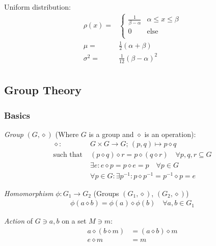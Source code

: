			\noindent
			Uniform distribution:
			\begin{equation}
				\begin{aligned}
					\rho(x) =& \left\{\begin{array}{ll}
					\frac{1}{\beta-\alpha} & \alpha\le x\le \beta \\
					0 & \text{else} \\
					\end{array}\right. \\
					\mu =& \frac{1}{2}(\alpha+\beta) \\
					\sigma^2 =& \frac{1}{12}(\beta-\alpha)^2 \\
				\end{aligned}
			\end{equation}

	\subsection{Group Theory}
		\subsubsection{Basics}
			\emph{Group} $(G, \diamond)$ (Where $G$ is a group and $\diamond$ is an operation):
			\begin{equation}
				\begin{aligned}
					\diamond: &G \times G \rightarrow G;\, (p,q) \mapsto p\diamond q \\
					\text{such that}\; &(p\diamond q)\diamond r = p\diamond (q\diamond r)\quad\forall{p,q,r}\subseteq G \\
					&\exists e: e\diamond p = p\diamond e = p\quad\forall p\in G\\
					&\forall p \in G: \exists p^{-1}: p\diamond p^{-1} = p^{-1}\diamond p=e
				\end{aligned}
			\end{equation}
			
			\noindent
			\emph{Homomorphism} $\phi: G_1 \rightarrow G_2$ (Groups $(G_1,\diamond)$, $(G_2,\diamond)$)
			\begin{equation}
				\begin{aligned}
					\phi(a \diamond b) = \phi(a) \diamond \phi(b) \quad \forall a,b \in G_1
				\end{aligned}
			\end{equation}
			
			\noindent
			\emph{Action} of $G\ni a, b$ on a set $M\ni m$:
			\begin{equation}
				\begin{aligned}
					a\diamond (b\diamond m) &= (a \diamond b) \diamond m \\
					e \diamond m &= m \\
				\end{aligned}
			\end{equation}
			
